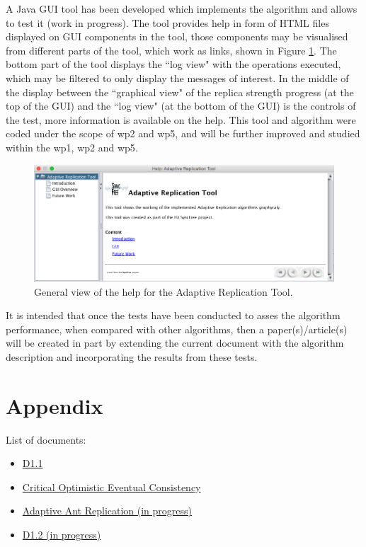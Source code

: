 \documentclass[12pt,twoside]{article}
\begin{document}
A Java GUI tool has been developed which implements the algorithm and allows to test it (work in progress). The tool provides help in form of HTML files displayed on GUI components in the tool, those components may be visualised from different parts of the tool, which work as links, shown in Figure \ref{fig:tool_help}. The bottom part of the tool displays the ``log view" with the operations executed, which may be filtered to only display the messages of interest. In the middle of the display between the ``graphical view" of the replica strength progress (at the top of the GUI) and the ``log view" (at the bottom of the GUI) is the controls of the test, more information is available on the help. This tool and algorithm were coded under the scope of  \gls{wp2} and \gls{wp5}, and will be further improved and studied within the \gls{wp1}, \gls{wp2} and \gls{wp5}.
\begin{figure}[ht!]
	\centering
	\includegraphics[width=1\textwidth]{figures/toolHelp.png}
	
	\caption{General view of the help for the Adaptive Replication Tool.}
	\label{fig:tool_help}
\end{figure}

It is intended that once the tests have been conducted to asses the algorithm performance, when compared with other algorithms, then a paper(s)/article(s) will be created in part by extending the current document with the algorithm description and incorporating the results from these tests.


\newpage


\printglossaries

\appendix
\section{Appendix}
List of documents:
\begin{itemize}
	\item \href{https://github.com/SyncFree/WP1/tree/master/D1_1/docs/wp1_D1.1_use_cases_in_natural_language.pdf}{D1.1}
	\item \href{https://github.com/SyncFree/WP1/blob/master/OCCSDoc/CriticalOptimisticEventualConsistency_0.1.pdf}{Critical Optimistic Eventual Consistency}
	\item \href{https://github.com/SyncFree/WP1/blob/master/AdaptiveReplication/docs/adaptiveAntReplication.pdf}{Adaptive Ant Replication (in progress)}
	\item \href{https://github.com/SyncFree/WP1/blob/master/D1.2/docs/D1_2.pdf}{D1.2 (in progress)}
\end{itemize}
%
\end{document}

